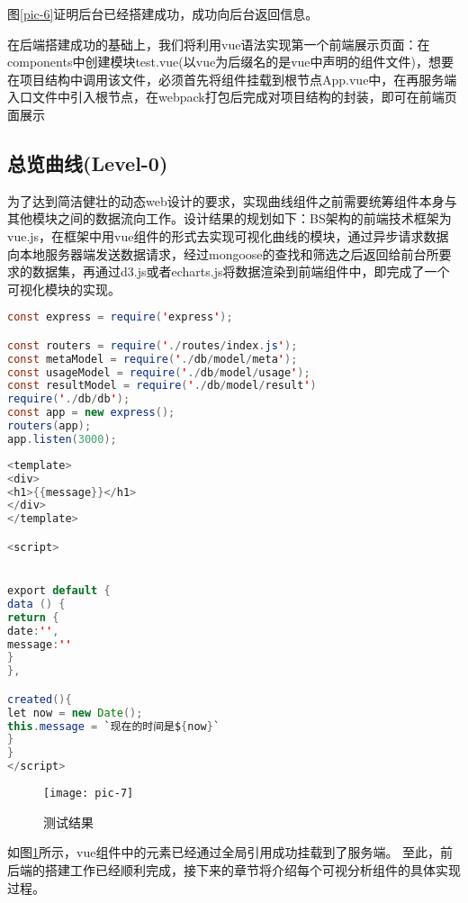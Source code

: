 图\ref{pic-6}证明后台已经搭建成功，成功向后台返回信息。

在后端搭建成功的基础上，我们将利用vue语法实现第一个前端展示页面：在components中创建模块test.vue(以vue为后缀名的是vue中声明的组件文件)，想要在项目结构中调用该文件，必须首先将组件挂载到根节点App.vue中，在再服务端入口文件中引入根节点，在webpack打包后完成对项目结构的封装，即可在前端页面展示

\subsection{总览曲线(Level-0)}

为了达到简洁健壮的动态web设计的要求，实现曲线组件之前需要统筹组件本身与其他模块之间的数据流向工作。设计结果的规划如下：BS架构的前端技术框架为vue.js，在框架中用vue组件的形式去实现可视化曲线的模块，通过异步请求数据向本地服务器端发送数据请求，经过mongoose的查找和筛选之后返回给前台所要求的数据集，再通过d3.js或者echarts.js将数据渲染到前端组件中，即完成了一个可视化模块的实现。

\begin{lstlisting}[caption=挂载服务器app,frame=shadowbox,language={java}]
const express = require('express');

const routers = require('./routes/index.js');
const metaModel = require('./db/model/meta');
const usageModel = require('./db/model/usage');
const resultModel = require('./db/model/result')
require('./db/db');
const app = new express();
routers(app);
app.listen(3000);
\end{lstlisting}

\begin{lstlisting}[caption=测试vue渲染DOM元素,frame=shadowbox,language={java}]
<template>
<div>
<h1>{{message}}</h1>
</div>
</template>

<script>


export default {
data () {
return {
date:'',
message:''
}
},

created(){
let now = new Date();
this.message = `现在的时间是${now}`
}
}
</script>
\end{lstlisting}

\begin{figure}[h]
	\centering
	\texttt{[image: pic-7]}
	\caption{测试结果}
	\label{pic-7}
\end{figure}

如图\ref{pic-7}所示，vue组件中的元素已经通过全局引用成功挂载到了服务端。
至此，前后端的搭建工作已经顺利完成，接下来的章节将介绍每个可视分析组件的具体实现过程。


